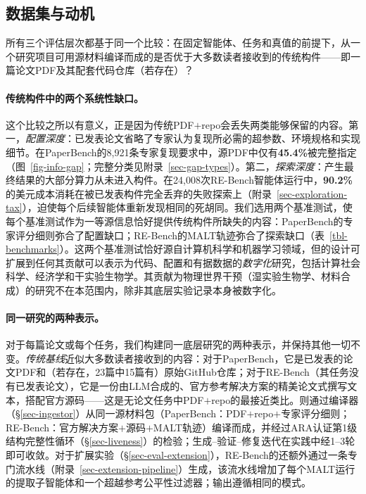 \subsection{数据集与动机}
\label{sec-eval-data}
\label{sec-eval-setup}\label{sec-eval-gap}\label{sec-eval-t1}\label{sec-eval-negative}\label{sec-eval-t3-exec}

所有三个评估层次都基于同一个比较：在固定智能体、任务和真值的前提下，从一个研究项目可用源材料编译而成的\ara{}是否优于大多数读者接收到的传统构件——即一篇论文PDF及其配套代码仓库（若存在）？

\paragraph{传统构件中的两个系统性缺口。}
这个比较之所以有意义，正是因为传统PDF$+$repo会丢失两类\ara{}能够保留的内容。第一，\emph{配置深度}：已发表论文省略了专家认为复现所必需的超参数、环境规格和实现细节。在PaperBench的8{,}921条专家复现要求中，源PDF中仅有\textbf{45.4\%}被完整指定（图~\ref{fig-info-gap}；完整分类见附录~\ref{sec-gap-types}）。第二，\emph{探索深度}：产生最终结果的大部分算力从未进入构件。在24{,}008次RE-Bench智能体运行中，\textbf{90.2\%}的美元成本消耗在被已发表构件完全丢弃的失败探索上（附录~\ref{sec-exploration-tax}），迫使每个后续智能体重新发现相同的死胡同。我们选用两个基准测试，使每个基准测试作为一等源信息恰好提供传统构件所缺失的内容：PaperBench的专家评分细则弥合了配置缺口；RE-Bench的MALT轨迹弥合了探索缺口（表~\ref{tbl-benchmarks}）。这两个基准测试恰好源自计算机科学和机器学习领域，但\ara{}的设计可扩展到任何其贡献可以表示为代码、配置和有据数据的\emph{数字化}研究，包括计算社会科学、经济学和干实验生物学。其贡献为物理世界干预（湿实验生物学、材料合成）的研究不在本范围内，除非其底层实验记录本身被数字化。

\paragraph{同一研究的两种表示。}
对于每篇论文或每个任务，我们构建同一底层研究的两种表示，并保持其他一切不变。\emph{传统基线}近似大多数读者接收到的内容：对于PaperBench，它是已发表的论文PDF和（若存在，23篇中15篇有）原始GitHub仓库；对于RE-Bench（其任务没有已发表论文），它是一份由LLM合成的、官方参考解决方案的精美论文式撰写文本，搭配官方源码——这是无论文任务中PDF$+$repo的最接近类比。\ara{}则通过\ara{}编译器（\S\ref{sec-ingestor}）从同一源材料包（PaperBench：PDF$+$repo$+$专家评分细则；RE-Bench：官方解决方案$+$源码$+$MALT轨迹）编译而成，并经过ARA认证第1级结构完整性循环（\S\ref{sec-liveness}）的检验；生成--验证--修复迭代在实践中经1--3轮即可收敛。对于扩展实验（\S\ref{sec-eval-extension}），RE-Bench的\ara{}还额外通过一条专门流水线（附录~\ref{sec-extension-pipeline}）生成，该流水线增加了每个MALT运行的提取子智能体和一个超越参考公平性过滤器；输出遵循相同的\ara{}模式。

